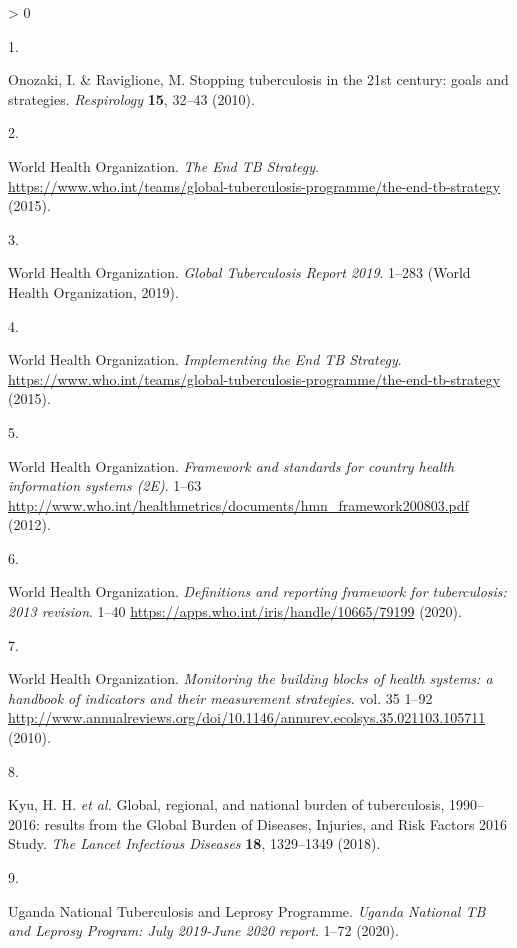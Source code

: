 \documentclass[
]{article}
\newlength{\cslhangindent}
\newlength{\csllabelwidth}
\newenvironment{CSLReferences}[2] %
 {%
  \setlength{\parindent}{0pt}
  \ifodd #1 \everypar{\setlength{\hangindent}{\cslhangindent}}\ignorespaces\fi
  \ifnum #2 > 0
  \setlength{\parskip}{#2\baselineskip}
  \fi
 }%
 {}
\newcommand{\CSLLeftMargin}[1]{\parbox[t]{\csllabelwidth}{#1}}
\newcommand{\CSLRightInline}[1]{\parbox[t]{\linewidth - \csllabelwidth}{#1}\break}
\begin{document}
\hypertarget{refs}{}
\begin{CSLReferences}{0}{0}
\leavevmode\hypertarget{ref-Onozaki2010}{}%
\CSLLeftMargin{1. }
\CSLRightInline{Onozaki, I. \& Raviglione, M. {Stopping tuberculosis in the 21st century: goals and strategies}. \emph{Respirology} \textbf{15}, 32--43 (2010).}

\leavevmode\hypertarget{ref-WorldHealthOrganization2015a}{}%
\CSLLeftMargin{2. }
\CSLRightInline{World Health Organization. \emph{{The End TB Strategy}}. \url{https://www.who.int/teams/global-tuberculosis-programme/the-end-tb-strategy} (2015).}

\leavevmode\hypertarget{ref-WorldHealthOrganization2019}{}%
\CSLLeftMargin{3. }
\CSLRightInline{World Health Organization. \emph{{Global Tuberculosis Report 2019}}. 1--283 (World Health Organization, 2019).}

\leavevmode\hypertarget{ref-WorldHealthOrganization2015}{}%
\CSLLeftMargin{4. }
\CSLRightInline{World Health Organization. \emph{{Implementing the End TB Strategy}}. \url{https://www.who.int/teams/global-tuberculosis-programme/the-end-tb-strategy} (2015).}

\leavevmode\hypertarget{ref-WHOWorldHealthOrganization2008}{}%
\CSLLeftMargin{5. }
\CSLRightInline{World Health Organization. \emph{{Framework and standards for country health information systems (2E)}}. 1--63 \url{http://www.who.int/healthmetrics/documents/hmn_framework200803.pdf} (2012).}

\leavevmode\hypertarget{ref-WorldHealthOrganization2020}{}%
\CSLLeftMargin{6. }
\CSLRightInline{World Health Organization. \emph{{Definitions and reporting framework for tuberculosis: 2013 revision}}. 1--40 \url{https://apps.who.int/iris/handle/10665/79199} (2020).}

\leavevmode\hypertarget{ref-WorldHealthOrganization2010}{}%
\CSLLeftMargin{7. }
\CSLRightInline{World Health Organization. \emph{{Monitoring the building blocks of health systems: a handbook of indicators and their measurement strategies}}. vol. 35 1--92 \url{http://www.annualreviews.org/doi/10.1146/annurev.ecolsys.35.021103.105711} (2010).}

\leavevmode\hypertarget{ref-Kyu2018}{}%
\CSLLeftMargin{8. }
\CSLRightInline{Kyu, H. H. \emph{et al.} {Global, regional, and national burden of tuberculosis, 1990--2016: results from the Global Burden of Diseases, Injuries, and Risk Factors 2016 Study}. \emph{The Lancet Infectious Diseases} \textbf{18}, 1329--1349 (2018).}

\leavevmode\hypertarget{ref-UgandaNationalTuberculosisandLeprosyProgramme2020}{}%
\CSLLeftMargin{9. }
\CSLRightInline{Uganda National Tuberculosis and Leprosy Programme. \emph{{Uganda National TB and Leprosy Program: July 2019-June 2020 report}}. 1--72 (2020).}


\end{CSLReferences}
\end{document}

